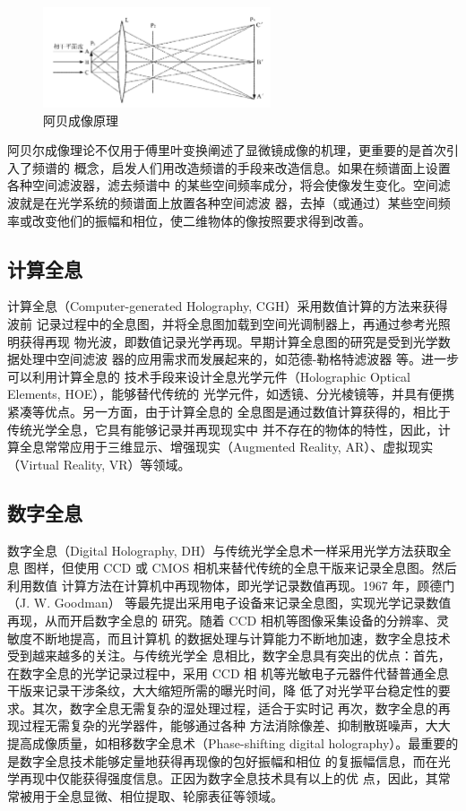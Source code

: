 \documentclass[10pt,a4paper,twoside,UTF8]{ctexart}
\begin{document}
\begin{figure}[H]
	\centering
		\includegraphics[width=0.6\textwidth]{fig/abei.png}
	\caption{阿贝成像原理}
	\label{fig:abei}
\end{figure}

阿贝尔成像理论不仅用于傅里叶变换阐述了显微镜成像的机理，更重要的是首次引入了频谱的
概念，启发人们用改造频谱的手段来改造信息。如果在频谱面上设置各种空间滤波器，滤去频谱中
的某些空间频率成分，将会使像发生变化。空间滤波就是在光学系统的频谱面上放置各种空间滤波
器，去掉（或通过）某些空间频率或改变他们的振幅和相位，使二维物体的像按照要求得到改善。
\subsection{计算全息}
计算全息（Computer-generated Holography, CGH）采用数值计算的方法来获得波前
记录过程中的全息图，并将全息图加载到空间光调制器上，再通过参考光照明获得再现
物光波，即数值记录光学再现。早期计算全息图的研究是受到光学数据处理中空间滤波
器的应用需求而发展起来的，如范德-勒格特滤波器\autocite{2} 等。进一步可以利用计算全息的
技术手段来设计全息光学元件（Holographic Optical Elements, HOE），能够替代传统的
光学元件，如透镜、分光棱镜等，并具有便携紧凑等优点。另一方面，由于计算全息的
全息图是通过数值计算获得的，相比于传统光学全息，它具有能够记录并再现现实中
并不存在的物体的特性，因此，计算全息常常应用于三维显示、增强现实（Augmented
Reality, AR）、虚拟现实（Virtual Reality, VR）等领域。
\subsection{数字全息}
数字全息（Digital Holography, DH）与传统光学全息术一样采用光学方法获取全息
图样，但使用 CCD 或 CMOS 相机来替代传统的全息干版来记录全息图。然后利用数值
计算方法在计算机中再现物体，即光学记录数值再现。1967 年，顾德门（J. W. Goodman）
等最先提出采用电子设备来记录全息图，实现光学记录数值再现，从而开启数字全息的
研究\autocite{3}。随着 CCD 相机等图像采集设备的分辨率、灵敏度不断地提高，而且计算机
的数据处理与计算能力不断地加速，数字全息技术受到越来越多的关注。与传统光学全
息相比，数字全息具有突出的优点：首先，在数字全息的光学记录过程中，采用 CCD 相
机等光敏电子元器件代替普通全息干版来记录干涉条纹，大大缩短所需的曝光时间，降
低了对光学平台稳定性的要求。其次，数字全息无需复杂的湿处理过程，适合于实时记
再次，数字全息的再现过程无需复杂的光学器件，能够通过各种
方法消除像差、抑制散斑噪声，大大提高成像质量，如相移数字全息术（Phase-shifting
digital holography）。最重要的是数字全息技术能够定量地获得再现像的包好振幅和相位
的复振幅信息，而在光学再现中仅能获得强度信息。正因为数字全息技术具有以上的优
点，因此，其常常被用于全息显微、相位提取、轮廓表征等领域。
\end{document}
